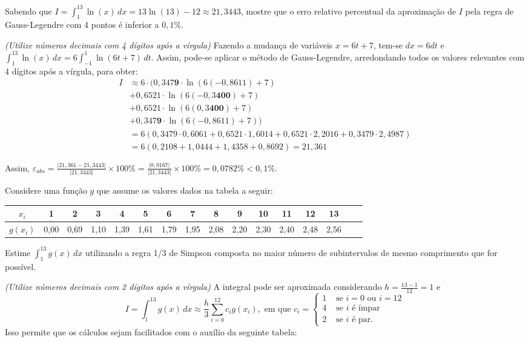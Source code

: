 \documentclass[12pt,a4paper]{article}
\begin{document}
\begin{ExerciseList}
\Exercise[title={3,0}] Sabendo que
$I = \int_{1}^{13} \ln(x) \, dx
= 13\ln(13) - 12
\approx 21,3443$,
mostre que o erro relativo percentual da aproximação de $I$ pela regra de Gauss-Legendre com 4 pontos é inferior a $0,1\%$.

{\color{blue} \textit{(Utilize números decimais com 4 dígitos após a vírgula)}}
\Answer
Fazendo a mudança de variáveis $x = 6t + 7$, tem-se $dx = 6 dt$ e
$\int_1^{13} \ln(x)\,dx = 6\int_{-1}^1 \ln(6t + 7)\,dt$.
Assim, pode-se aplicar o método de Gauss-Legendre, arredondando todos os valores relevantes com 4 dígitos após a vírgula, para obter:
\begin{align*}
I & \approx
6 \cdot (  0,347\textbf{9} \cdot \ln(6(-0,8611) + 7) \\
& + 0,6521          \cdot \ln(6(-0,3\textbf{400}) + 7)\\
& + 0,6521          \cdot \ln(6( 0,3\textbf{400}) + 7)\\
& + 0,347\textbf{9} \cdot \ln(6(-0,8611) + 7) )\\
& = 
6(0,3479 \cdot 0,6061
+ 0,6521 \cdot 1,6014
+ 0,6521 \cdot 2,2016
+ 0,3479 \cdot 2,4987)\\
& = 6( 0,2108 + 1,0444 + 1,4358 + 0,8692 ) = 21,361
\end{align*}

Assim, $\varepsilon_{abs} = \frac{|21,361 - 21,3443| }{ |21,3443| }\times 100\%
 = \frac{ |0,0167| }{ |21,3443| } \times 100\%
 = 0,0782 \% < 0,1\%$.

\Exercise[title={3,0}] 
Considere uma função $g$ que assume os valores dados na tabela a seguir:
\medskip
\begin{center}
\begin{tabular}{|c|c|c|c|c|c|c|c|c|c|c|c|c|c|c|c|}
\hline
   $x_i$ & 1    & 2 & 3 & 4 & 5 & 6 & 7 & 8 & 9 & 10 & 11 & 12 & 13 \\ \hline
$g(x_i)$ & 0,00 & 0,69 & 1,10 & 1,39 & 1,61 & 1,79 & 1,95 & 2,08 & 2,20 & 2,30 & 2,40 & 2,48 & 2,56 \\ \hline
\end{tabular}
\end{center}
\medskip
Estime $\int_1^{13} g(x)\,dx$ utilizando a regra 1/3 de Simpson composta no maior número de subintervalos de mesmo comprimento que for possível.

{\color{blue} \textit{(Utilize números decimais com 2 dígitos após a vírgula)}}
\Answer A integral pode ser aproximada considerando $h = \frac{13-1}{12} = 1$ e
\[
I = 
\int_1^{13} g(x)\,dx
\approx \frac{h}{3} \sum_{i=0}^{12} c_ig(x_i),
\text{ em que }
c_i =
\begin{cases}
1 & \text{ se } i = 0 \text{ ou } i = 12\\
4 & \text{ se } i \text{ é ímpar}\\
2 & \text{ se } i \text{ é par}.
\end{cases}
\]
Isso permite que os cálculos sejam facilitados com o auxílio da seguinte tabela:


\end{ExerciseList}
\end{document}
